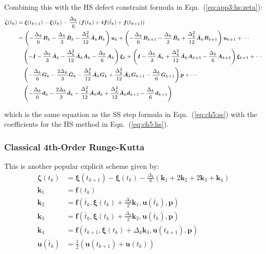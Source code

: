 \noindent Combining this with the HS defect constraint formula in Eqn.~(\ref{eq:app3:hs:zeta}):
\begin{subequations}
\footnotesize
\begin{align}
\bm{\zeta}(t_k) &= \bm{\xi}(t_{k+1}) - \bm{\xi}(t_{k}) - \frac{\Delta_k}{6} \left( \bm{f}(t_k) + 4\bm{f}(\bar{t}_k) + \bm{f}(t_{k+1}) \right) \\
%
&= \left( - \frac{\Delta_k}{6} \bm{B}_{k} - \frac{\Delta_k}{3}\bar{\bm{B}}_k - \frac{\Delta_k^2}{12} \bar{\bm{A}}_k \bm{B}_{k} \right) \bm{u}_{k} + \left( - \frac{\Delta_k}{6} \bm{B}_{k+1} - \frac{\Delta_k}{3}\bar{\bm{B}}_k + \frac{\Delta_k^2}{12} \bar{\bm{A}}_k \bm{B}_{k+1} \right) \bm{u}_{k+1}  + \cdots \notag \\
&\quad \left( -\bm{I} - \frac{\Delta_k}{3}\bar{\bm{A}}_k - \frac{\Delta_k^2}{12} \bar{\bm{A}}_k \bm{A}_{k} - \frac{\Delta_k}{6} \bm{A}_k \right) \bm{\xi}_{k} + \left( \bm{I} - \frac{\Delta_k}{3}\bar{\bm{A}}_k + \frac{\Delta_k^2}{12} \bar{\bm{A}}_k \bm{A}_{k+1} - \frac{\Delta_k}{6} \bm{A}_{k+1} \right) \bm{\xi}_{k+1} + \cdots \notag \\
&\quad \left( -\frac{\Delta_k}{6}\bm{G}_k - \frac{2\Delta_k}{3}\bar{\bm{G}}_k - \frac{\Delta_k^2}{12}\bar{\bm{A}}_k\bm{G}_k + \frac{\Delta_k^2}{12}\bar{\bm{A}}_k\bm{G}_{k+1} - \frac{\Delta_k}{6}\bm{G}_{k+1} \right) \bm{p} + \cdots \notag \\
&\quad \left( -\frac{\Delta_k}{6}\bm{d}_k - \frac{2\Delta_k}{3}\bar{\bm{d}}_k - \frac{\Delta_k^2}{12}\bar{\bm{A}}_k\bm{d}_k + \frac{\Delta_k^2}{12}\bar{\bm{A}}_k\bm{d}_{k+1} - \frac{\Delta_k}{6}\bm{d}_{k+1}  \right) 
\end{align}
\end{subequations}

\noindent which is the same equation as the SS step formula in Eqn.~(\ref{eq:ch5:ss}) with the coefficients for the HS method in Eqn.~(\ref{eq:ch5:hs}).

\subsubsection{Classical 4th-Order Runge-Kutta}
This is another popular explicit scheme given by:
\begin{subequations}
\begin{align}
\bm{\zeta}(t_k) &= \bm{\xi}(t_{k+1}) - \bm{\xi}(t_{k}) - \frac{\Delta_k}{6} \left( \bm{k}_1 + 2\bm{k}_2 + 2\bm{k}_3 + \bm{k}_4 \right) \\
\bm{k}_1 &= \bm{f}(t_k) \\
\bm{k}_2 &= \bm{f}\left( \bar{t}_k, \bm{\xi}(t_k) + \frac{\Delta_k}{2} \bm{k}_1, \bm{u}(\bar{t}_k), \bm{p} \right) \\
\bm{k}_3 &= \bm{f}\left( \bar{t}_k, \bm{\xi}(t_k) + \frac{\Delta_k}{2} \bm{k}_2, \bm{u}(\bar{t}_k), \bm{p} \right) \\
\bm{k}_4 &= \bm{f}\left( t_{k+1}, \bm{\xi}(t_k) + \Delta_k \bm{k}_3, \bm{u}(t_{k+1}), \bm{p} \right) \\
\bm{u}(\bar{t}_k) &= \frac{1}{2} \left( \bm{u}(t_{k+1}) + \bm{u}(t_{k}) \right)
\end{align}
\end{subequations}